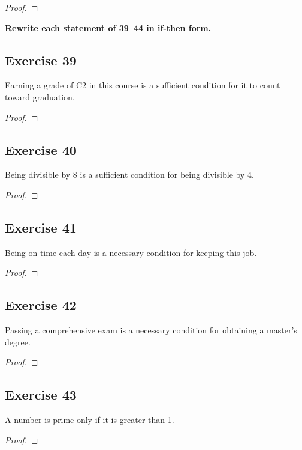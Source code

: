 \documentclass[14pt]{extarticle}
\begin{document}
\begin{proof}

\end{proof}

{\bf \color{cyan} Rewrite each statement of 39–44 in if-then form.}

\subsection{Exercise 39}
Earning a grade of C2 in this course is a sufficient condition for it to count toward graduation.
\begin{proof}

\end{proof}

\subsection{Exercise 40}
Being divisible by 8 is a sufficient condition for being divisible by 4.
\begin{proof}

\end{proof}

\subsection{Exercise 41}
Being on time each day is a necessary condition for keeping this job.

\begin{proof}

\end{proof}

\subsection{Exercise 42}
Passing a comprehensive exam is a necessary condition for obtaining a master’s degree.

\begin{proof}

\end{proof}

\subsection{Exercise 43}
A number is prime only if it is greater than 1.

\begin{proof}

\end{proof}
\end{document}
